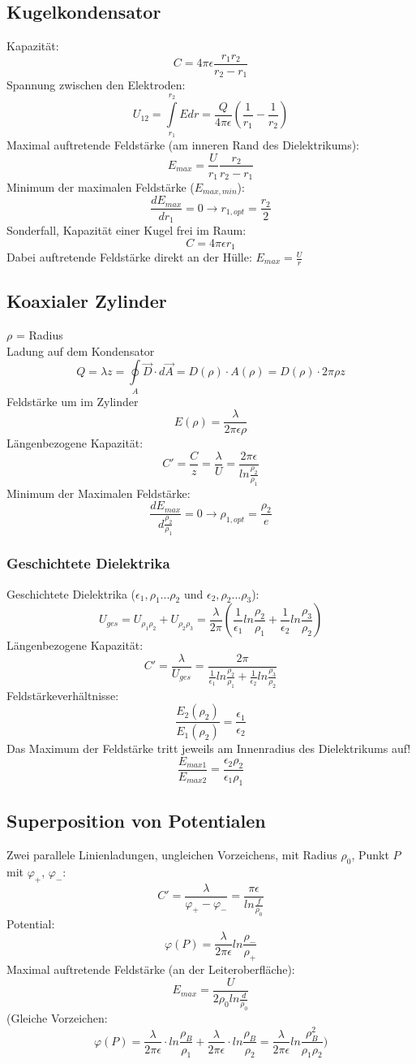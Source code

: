\documentclass[12pt,a4paper]{article}
\begin{document}
\subsection{Kugelkondensator}
Kapazität:
\[C = 4\pi\epsilon \frac{r_1r_2}{r_2-r_1}\]
Spannung zwischen den Elektroden:
\[U_{12} = \int\limits_{r_1}^{r_2}{Edr} = \frac{Q}{4\pi\epsilon}(\frac{1}{r_1}-\frac{1}{r_2})\]
Maximal auftretende Feldstärke (am inneren Rand des Dielektrikums):
\[E_{max} = \frac{U}{r_1}\frac{r_2}{r_2-r_1}\]
Minimum der maximalen Feldstärke ($E_{max, min}$):
\[\frac{dE_{max}}{dr_1} = 0 \rightarrow r_{1,opt} = \frac{r_2}{2}\]
Sonderfall,  Kapazität einer Kugel frei im Raum: 
\[C = 4\pi\epsilon r_1\]
Dabei auftretende Feldstärke direkt an der Hülle:
$E_{max} = \frac{U}{r}$

\subsection{Koaxialer Zylinder}
$\rho$ = Radius\\
Ladung auf dem Kondensator
\[Q = \lambda z = \oint\limits_A{\vec{D}\cdot d\vec{A}} = D(\rho) \cdot A(\rho) = D(\rho) \cdot 2\pi\rho z\]
Feldstärke um im Zylinder
\[E(\rho) = \frac{\lambda}{2\pi\epsilon\rho}\]
Längenbezogene Kapazität:
\[C' = \frac{C}{z} = \frac{\lambda}{U} = \frac{2\pi\epsilon}{ln\frac{\rho_2}{\rho_1}}\]
Minimum der Maximalen Feldstärke:
\[\frac{dE_{max}}{d\frac{\rho_2}{\rho_1}} = 0 \rightarrow \rho_{1,opt} = \frac{\rho_2}{e}\]

\subsubsection{Geschichtete Dielektrika}
Geschichtete Dielektrika ($\epsilon_1, \rho_1 ...\rho_2$ und $\epsilon_2, \rho_2 ... \rho_3$):
\[U_{ges} = U_{\rho_1\rho_2} + U_{\rho_2\rho_3} = \frac{\lambda}{2\pi}(\frac{1}{\epsilon_1}ln\frac{\rho_2}{\rho_1}+\frac{1}{\epsilon_2}ln\frac{\rho_3}{\rho_2})\]
Längenbezogene Kapazität:
\[C' = \frac{\lambda}{U_{ges}} = \frac{2\pi}{\frac{1}{\epsilon_1}ln\frac{\rho_2}{\rho_1}+\frac{1}{\epsilon_2}ln\frac{\rho_3}{\rho_2}}\]
Feldstärkeverhältnisse:
\[\frac{E_2(\rho_2)}{E_1(\rho_2)} = \frac{\epsilon_1}{\epsilon_2}\]
Das Maximum der Feldstärke tritt jeweils am Innenradius des Dielektrikums auf!
\[\frac{E_{max1}}{E_{max2}}=\frac{\epsilon_2 \rho_2}{\epsilon_1 \rho_1}\]

\subsection{Superposition von Potentialen}
Zwei parallele Linienladungen, ungleichen Vorzeichens, mit Radius $\rho_0$, Punkt $P$ mit $\varphi_+$, $\varphi_-$:
\[C' = \frac{\lambda}{\varphi_+ - \varphi_-} = \frac{\pi\epsilon}{ln\frac{f}{\rho_0}}\]
Potential:
\[\varphi(P) = \frac{\lambda}{2\pi\epsilon}ln\frac{\rho_-}{\rho_+}\]
Maximal auftretende Feldstärke (an der Leiteroberfläche):
\[E_{max} = \frac{U}{2\rho_0 ln\frac{d}{\rho_0}}\]
(Gleiche Vorzeichen:
\[\varphi(P) = \frac{\lambda}{2\pi \epsilon}\cdot ln\frac{\rho_B}{\rho_1} + \frac{\lambda}{2\pi\epsilon}\cdot ln\frac{\rho_B}{\rho_2} =  \frac{\lambda}{2\pi\epsilon}ln\frac{\rho_B^2}{\rho_1\rho_2})\]
\end{document}
